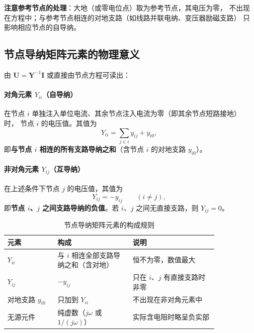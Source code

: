 \textbf{注意参考节点的处理}：大地（或零电位点）取为参考节点，其电压为零，
不出现在方程中；与参考节点相连的对地支路（如线路并联电纳、变压器励磁支路）
只影响相应节点的自导纳。

\subsection{节点导纳矩阵元素的物理意义}

由 $\boldsymbol U=\boldsymbol Y^{-1}\boldsymbol I$ 或直接由节点方程可读出：

\paragraph{对角元素 $Y_{ii}$（自导纳）}
在节点 $i$ 单独注入单位电流、其余节点注入电流为零（即其余节点短路接地）时，
节点 $i$ 的电压值。其值为
\begin{equation}
  Y_{ii}=\sum_{j\in i}y_{ij}+y_{i0},
\end{equation}
即\textbf{与节点 $i$ 相连的所有支路导纳之和}（含节点 $i$ 的对地支路 $y_{i0}$）。

\paragraph{非对角元素 $Y_{ij}$（互导纳）}
在上述条件下节点 $j$ 的电压值，其值为
\begin{equation}
  Y_{ij}=-y_{ij}\qquad(i\ne j),
\end{equation}
即\textbf{节点 $i$、$j$ 之间支路导纳的负值}。若 $i$、$j$ 之间无直接支路，则 $Y_{ij}=0$。

\begin{table}[htbp]
  \centering
  \caption{节点导纳矩阵元素的构成规则}
  \small
  \begin{tabular}{@{}p{0.20\linewidth}p{0.30\linewidth}p{0.34\linewidth}@{}}
    \toprule
    元素 & 构成 & 说明 \\
    \midrule
    $Y_{ii}$ & 与 $i$ 相连全部支路导纳之和（含对地） & 恒不为零，数值最大 \\
    $Y_{ij}$ & $-y_{ij}$ & 只在 $i$、$j$ 有直接支路时非零 \\
    对地支路 $y_{i0}$ & 只加到 $Y_{ii}$ & 不出现在非对角元素中 \\
    无源元件 & 纯虚数（$j\omega$ 或 $1/(j\omega)$） & 实际含电阻时略呈负实部 \\
    \bottomrule
  \end{tabular}
\end{table}


